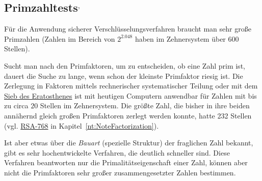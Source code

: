 \begin{refsegment}
\section[Primzahltests]{Primzahltests\footnotemark$^,$\footnotemark}
\addtocounter{footnote}{-1}
\addtocounter{footnote}{1}
\label{primality_tests}   %

Für die Anwendung sicherer Verschlüsselungsverfahren braucht man sehr große
Primzahlen (Zahlen im Bereich von $2^{2.048}$ haben im Zehnersystem
über $600$ Stellen).

Sucht man nach den Primfaktoren, um zu entscheiden, ob eine Zahl prim ist,
dauert die Suche zu lange, wenn schon der kleinste Primfaktor riesig ist.
Die Zerlegung in Faktoren mittels rechnerischer systematischer Teilung oder
mit dem \hyperlink{SieveEratosthenes01}{Sieb des Eratosthenes}
 ist mit heutigen Computern anwendbar
für Zahlen mit bis zu circa $20$ Stellen im Zehnersystem.
Die größte Zahl, die bisher in ihre beiden annähernd gleich großen
Primfaktoren zerlegt werden konnte, hatte 232 Stellen
(vgl. \hyperlink{RSA-768-chap3}{RSA-768} in Kapitel~\ref{nt:NoteFactorization}).


Ist aber etwas über die {\em Bauart} (spezielle Struktur) der fraglichen
Zahl bekannt, gibt es sehr hochentwickelte Verfahren, die deutlich schneller
sind. Diese Verfahren beantworten nur die Primalitätseigenschaft einer Zahl,
können aber nicht die Primfaktoren sehr großer zusammengesetzter Zahlen
bestimmen.


\end{refsegment}
